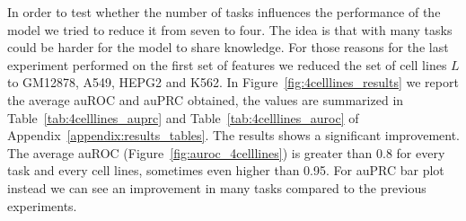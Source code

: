 
In order to test whether the number of tasks influences the performance of the model we tried to reduce it from seven to four. The idea is that with many tasks could be harder for the model to share knowledge. For those reasons for the last experiment performed on the first set of features we reduced the set of cell lines $L$ to GM12878, A549, HEPG2 and K562. In Figure~\ref{fig:4celllines_results} we report the average auROC and auPRC obtained, the values are summarized in Table~\ref{tab:4celllines_auprc} and Table~\ref{tab:4celllines_auroc} of Appendix~\ref{appendix:results_tables}. The results shows a significant improvement. The average auROC (Figure~\ref{fig:auroc_4celllines}) is greater than 0.8 for every task and every cell lines, sometimes even higher than 0.95. For auPRC bar plot instead we can see an improvement in many tasks compared to the previous experiments.
